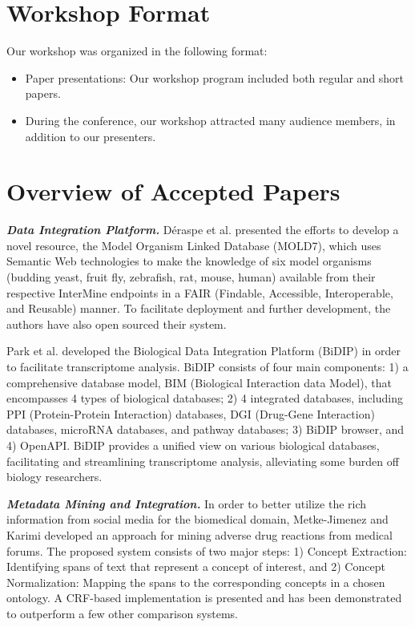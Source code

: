 \documentclass[runningheads,a4paper]{llncs}
\begin{document}
\section{Workshop Format}

Our workshop was organized in the following format:

\begin{itemize}

\setlength{\itemsep}{5pt}

\item Paper presentations: Our workshop program included both regular and short papers.

\item During the conference, our workshop attracted many audience members, in addition to our presenters.

\end{itemize}

\section{Overview of Accepted Papers}
\label{section:paper_overview}

\textit{\textbf{Data Integration Platform.}} D\'{e}raspe et al. presented the efforts to develop a novel resource, the Model Organism Linked Database (MOLD7), which uses Semantic Web technologies to make the knowledge of six model organisms (budding yeast, fruit fly, zebrafish, rat, mouse, human) available from their respective InterMine endpoints in a FAIR (Findable, Accessible, Interoperable, and Reusable) \cite{citeulike:13980485} manner. To facilitate deployment and further development, the authors have also open sourced their system.

Park et al. developed the Biological Data Integration Platform (BiDIP) in order to facilitate transcriptome analysis. BiDIP consists of four main components: 1) a comprehensive database model, BIM (Biological Interaction data Model), that encompasses 4 types of biological databases; 2) 4 integrated databases, including PPI (Protein-Protein Interaction) databases, DGI (Drug-Gene Interaction) databases, microRNA databases, and pathway databases; 3) BiDIP browser, and 4) OpenAPI. BiDIP provides a unified view on various biological databases, facilitating and streamlining transcriptome analysis, alleviating some burden off biology researchers.

\textit{\textbf{Metadata Mining and Integration.}} In order to better utilize the rich information from social media for the biomedical domain, Metke-Jimenez and Karimi developed an approach for mining adverse drug reactions from medical forums. The proposed system consists of two major steps: 1) Concept Extraction: Identifying spans of text that represent a concept of interest, and 2) Concept Normalization: Mapping the spans to the corresponding concepts in a chosen ontology. A CRF-based implementation is presented and has been demonstrated to outperform a few other comparison systems.
\end{document}
